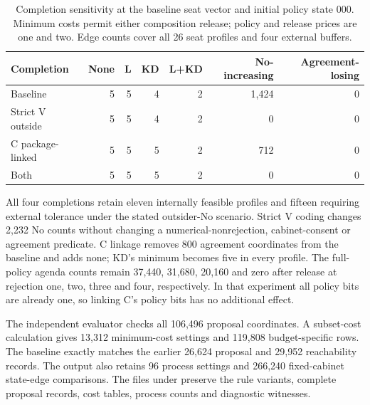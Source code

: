 \begin{table}[htbp]\centering\small
\caption{Completion sensitivity at the baseline seat vector and initial policy state \(000\). Minimum costs permit either composition release; policy and release prices are one and two. Edge counts cover all 26 seat profiles and four external buffers.}\label{tab:completion}
\begin{tabular}{lrrrrrr}\toprule
Completion & None & L & KD & L+KD & No-increasing & Agreement-losing\\\midrule
Baseline & 5&5&4&2&1,424&0\\
Strict V outside & 5&5&4&2&0&0\\
C package-linked & 5&5&5&2&712&0\\
Both & 5&5&5&2&0&0\\\bottomrule
\end{tabular}
\end{table}

All four completions retain eleven internally feasible profiles and fifteen requiring external tolerance under the stated outsider-No scenario. Strict V coding changes 2,232 No counts without changing a numerical-nonrejection, cabinet-consent or agreement predicate. C linkage removes 800 agreement coordinates from the baseline and adds none; KD's minimum becomes five in every profile. The full-policy agenda counts remain 37,440, 31,680, 20,160 and zero after release at rejection one, two, three and four, respectively. In that experiment all policy bits are already one, so linking C's policy bits has no additional effect.

The independent evaluator checks all 106,496 proposal coordinates. A subset-cost calculation gives 13,312 minimum-cost settings and 119,808 budget-specific rows. The baseline exactly matches the earlier 26,624 proposal and 29,952 reachability records. The output also retains 96 process settings and 266,240 fixed-cabinet state-edge comparisons. The files under  preserve the rule variants, complete proposal records, cost tables, process counts and diagnostic witnesses.

